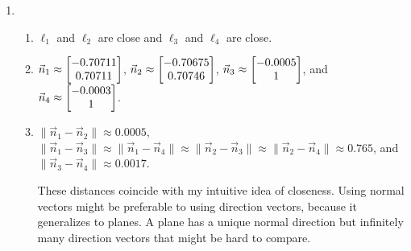 \begin{enumerate}
			\item \begin{enumerate}
				\item $\ell_1$ and $\ell_2$ are close and $\ell_3$ and $\ell_4$ are close.
				\item $\vec n_1\approx\begin{bmatrix}-0.70711\\0.70711\end{bmatrix}$,
					$\vec n_2\approx\begin{bmatrix}-0.70675\\0.70746\end{bmatrix}$,
					$\vec n_3\approx\begin{bmatrix}-0.0005\\1\end{bmatrix}$, and $\vec n_4\approx\begin{bmatrix}-0.0003\\1\end{bmatrix}$.
				\item
					$\|\vec n_1-\vec n_2\|\approx 0.0005$,
					$\|\vec n_1-\vec n_3\|\approx \|\vec n_1-\vec n_4\|
					\approx \|\vec n_2-\vec n_3\|\approx \|\vec n_2-\vec n_4\|\approx 0.765$,
					and
					$\|\vec n_3-\vec n_4\|\approx 0.0017$.

					These distances coincide with my intuitive idea of closeness. Using normal
					vectors might be preferable to using direction vectors, because it generalizes to
					planes. A plane has a unique
					normal direction but infinitely many direction vectors that might be hard to compare.
			\end{enumerate}
		\end{enumerate}